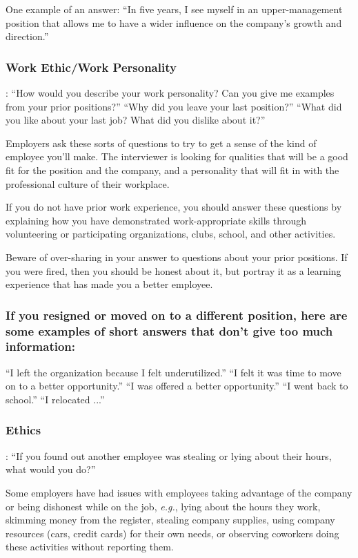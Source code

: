One example of an answer:
\break ``In five years, I see myself in an upper-management position that allows me to have a wider influence on the company's growth and direction.''

\subsubsection*{Work Ethic/Work Personality}:
\break ``How would you describe your work personality? Can you give me examples from your prior positions?''
\break ``Why did you leave your last position?''
\break ``What did you like about your last job? What did you dislike about it?''

Employers ask these sorts of questions to try to get a sense of the kind of employee you'll make. The interviewer is looking for qualities that will be a good fit for the position and the company, and a personality that will fit in with the professional culture of their workplace.

If you do not have prior work experience, you should answer these questions by explaining how you have demonstrated work-appropriate skills through volunteering or participating organizations, clubs, school, and other activities.

Beware of over-sharing in your answer to questions about your prior positions. If you were fired, then you should be honest about it, but portray it as a learning experience that has made you a better employee.

\subsubsection*{If you resigned or moved on to a different position, here are some examples of short answers that don't give too much information:}
\break ``I left the organization because I felt underutilized.''
\break ``I felt it was time to move on to a better opportunity.''
\break ``I was offered a better opportunity.''
\break ``I went back to school.''
\break ``I relocated ...''

\subsubsection*{Ethics}: ``If you found out another employee was stealing or lying about their hours, what would you do?''

Some employers have had issues with employees taking advantage of the company or being dishonest while on the job, \textit{e.g.}, lying about the hours they work, skimming money from the register, stealing company supplies, using company resources (cars, credit cards) for their own needs, or observing coworkers doing these activities without reporting them.

